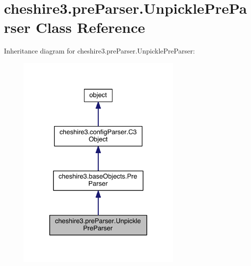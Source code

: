 \hypertarget{classcheshire3_1_1pre_parser_1_1_unpickle_pre_parser}{\section{cheshire3.\-pre\-Parser.\-Unpickle\-Pre\-Parser Class Reference}
\label{classcheshire3_1_1pre_parser_1_1_unpickle_pre_parser}
}


Inheritance diagram for cheshire3.\-pre\-Parser.\-Unpickle\-Pre\-Parser\-:
\nopagebreak
\begin{figure}[H]
\begin{center}
\leavevmode
\includegraphics[width=228pt]{classcheshire3_1_1pre_parser_1_1_unpickle_pre_parser__inherit__graph}
\end{center}
\end{figure}


